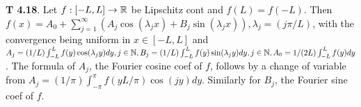 {\bf T 4.18}. Let $f: [-L,L]\rightarrow \mathbb{R}$ be Lipschitz cont and $f(L)=f(-L)$. Then $f(x) = A_0 + \sum_{j=1}^{\infty}(A_j\cos(\lambda_jx) + B_j \sin(\lambda_jx)), \lambda_j=(j\pi/L)$, with the convergence being uniform in $x \in [-L,L]$ and $A_j=(1/L)\int_{-L}^L f(y)\cos(\lambda_jy)dy, j \in \mathbb{N}, B_j=(1/L)\int_{-L}^L f(y)\sin(\lambda_jy)dy, j \in \mathbb{N}, A_0=1/(2L)\int_{-L}^L f(y)dy$. The formula of $A_j$, the Fourier cosine coef of $f$, follows by a change of variable from $A_j=(1/\pi)\int_{-\pi}^{\pi} f(yL/\pi)\cos(jy)dy$. Similarly for $B_j$, the Fourier sine coef of $f$. 